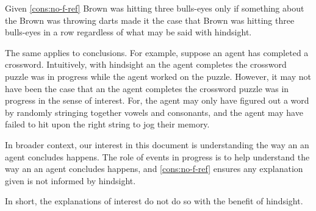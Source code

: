 \begin{note}
  Given \autoref{cons:no-f-ref} Brown was hitting three bulls-eyes only if something about the  Brown was throwing darts made it the case that Brown was hitting three bulls-eyes in a row regardless of what may be said with hindsight.

  The same applies to conclusions.
  For example, suppose an agent has completed a crossword.
  Intuitively, with hindsight an  the agent completes the crossword puzzle was in progress while the agent worked on the puzzle.
  However, it may not have been the case that an  the agent completes the crossword puzzle was in progress in the sense of interest.
  For, the agent may only have figured out a word by randomly stringing together vowels and consonants, and the agent may have failed to hit upon the right string to jog their memory.
\end{note}


\begin{note}
  In broader context, our interest in this document is understanding the way an  an agent concludes happens.
  The role of events in progress is to help understand the way an  an agent concludes happens, and \autoref{cons:no-f-ref} ensures any explanation given is not informed by hindsight.

  In short, the explanations of interest do not do so with the benefit of hindsight.
\end{note}






